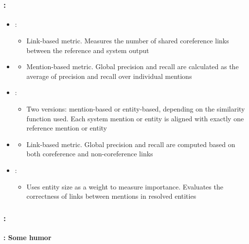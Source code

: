\documentclass[xcolor=table]{beamer}
\begin{document}
\begin{frame}
	\frametitle{\insertshortsubtitle: \insertsection}
	\framesubtitle{\insertsubsection}
	
	\begin{itemize}
		\item {}: 
		\begin{itemize}
			\item Link-based metric. 
			Measures the number of shared coreference links between the reference and system output
		\end{itemize}
		
		\item {}
		\begin{itemize}
			\item Mention-based metric. 
			Global precision and recall are calculated as the average of precision and recall over individual mentions
		\end{itemize}
		
		\item {}: 
		\begin{itemize}
			\item Two versions: mention-based or entity-based, depending on the similarity function used.
			Each system mention or entity is aligned with exactly one reference mention or entity
		\end{itemize}
		
		\item {} 
		\begin{itemize}
			\item Link-based metric.
			Global precision and recall are computed based on both coreference and non-coreference links
		\end{itemize}
		
		\item {}: 
		\begin{itemize}
			\item Uses entity size as a weight to measure importance.
			Evaluates the correctness of links between mentions in resolved entities
		\end{itemize}
	\end{itemize}
\end{frame}


\begin{frame}
	\frametitle{\insertshortsubtitle: \insertsection}
	\framesubtitle{\insertsubsection: Some humor}
	
	\begin{center}
	\end{center}
	
\end{frame}
\end{document}

